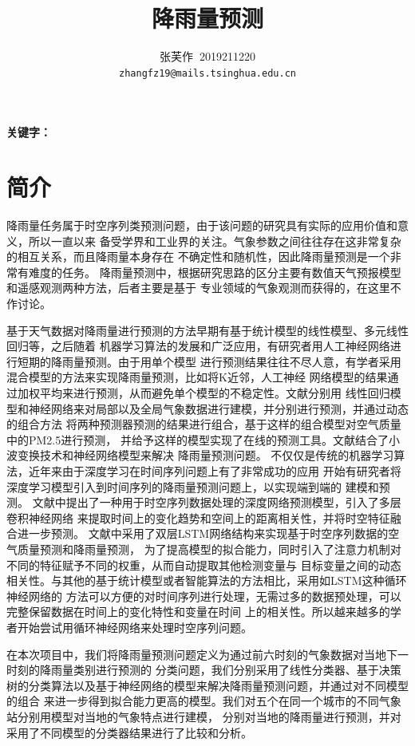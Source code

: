 \documentclass[UTF8]{ctexart}
\title{降雨量预测} %
\author{张芙作$\;\;$2019211220\\ \texttt{zhangfz19@mails.tsinghua.edu.cn}} %
\date{} %
\begin{document}
\normalsize

\maketitle %
\setlength{\baselineskip}{18pt}
\begin{abstract}
\end{abstract}
\textbf{关键字：}
\section{简介}
降雨量任务属于时空序列类预测问题，由于该问题的研究具有实际的应用价值和意义，所以一直以来
备受学界和工业界的关注。气象参数之间往往存在这非常复杂的相互关系，而且降雨量本身存在
不确定性和随机性，因此降雨量预测是一个非常有难度的任务。
降雨量预测中，根据研究思路的区分主要有数值天气预报模型和遥感观测两种方法\cite{bit1}，后者主要是基于
专业领域的气象观测而获得的，在这里不作讨论。

基于天气数据对降雨量进行预测的方法早期有基于统计模型的线性模型、多元线性回归等，之后随着
机器学习算法的发展和广泛应用，有研究者用人工神经网络进行短期的降雨量预测。由于用单个模型
进行预测结果往往不尽人意，有学者采用混合模型的方法来实现降雨量预测，比如将K近邻，人工神经
网络模型的结果通过加权平均来进行预测，从而避免单个模型的不稳定性。文献\cite{bit3}分别用
线性回归模型和神经网络来对局部以及全局气象数据进行建模，并分别进行预测，并通过动态的组合方法
将两种预测器预测的结果进行组合，基于这样的组合模型对空气质量中的PM2.5进行预测，
并给予这样的模型实现了在线的预测工具。文献\cite{bit4}结合了小波变换技术和神经网络模型来解决
降雨量预测问题。
不仅仅是传统的机器学习算法，近年来由于深度学习在时间序列问题上有了非常成功的应用
开始有研究者将深度学习模型引入到时间序列的降雨量预测问题上，以实现端到端的
建模和预测。
文献\cite{bit5}中提出了一种用于时空序列数据处理的深度网络预测模型，引入了多层卷积神经网络
来提取时间上的变化趋势和空间上的距离相关性，并将时空特征融合进一步预测。
文献\cite{bit2}中采用了双层LSTM网络结构来实现基于时空序列数据的空气质量预测和降雨量预测，
为了提高模型的拟合能力，同时引入了注意力机制对不同的特征赋予不同的权重，从而自动提取其他检测变量与
目标变量之间的动态相关性。与其他的基于统计模型或者智能算法的方法相比，采用如LSTM这种循环神经网络的
方法可以方便的对时间序列进行处理，无需过多的数据预处理，可以完整保留数据在时间上的变化特性和变量在时间
上的相关性。所以越来越多的学者开始尝试用循环神经网络来处理时空序列问题。

在本次项目中，我们将降雨量预测问题定义为通过前六时刻的气象数据对当地下一时刻的降雨量类别进行预测的
分类问题，我们分别采用了线性分类器、基于决策树的分类算法以及基于神经网络的模型来解决降雨量预测问题，并通过对不同模型的组合
来进一步得到拟合能力更高的模型。我们对五个在同一个城市的不同气象站分别用模型对当地的气象特点进行建模，
分别对当地的降雨量进行预测，并对采用了不同模型的分类器结果进行了比较和分析。
\end{document}
